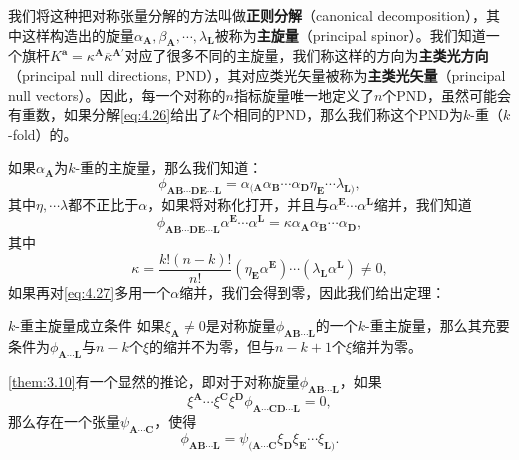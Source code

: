我们将这种把对称张量分解的方法叫做\textbf{正则分解}（canonical decomposition），其中这样构造出的旋量$\alpha _{\boldsymbol{A}} ,\beta _{\boldsymbol{A}} ,\cdots ,\lambda _{\boldsymbol{L}}$被称为\textbf{主旋量}（principal spinor）。我们知道一个旗杆$K^{\boldsymbol{a}} =\kappa ^{\boldsymbol{A}}\overline{\kappa }^{\boldsymbol{A} '}$对应了很多不同的主旋量，我们称这样的方向为\textbf{主类光方向}（principal null directions, PND），其对应类光矢量被称为\textbf{主类光矢量}（principal null vectors）。因此，每一个对称的$n$指标旋量唯一地定义了$n$个PND，虽然可能会有重数，如果分解\ref{eq:4.26}给出了$k$个相同的PND，那么我们称这个PND为$k$-重（$k$-fold）的。



如果$\alpha _{\boldsymbol{A}}$为$k$-重的主旋量，那么我们知道：
\begin{equation*}
	\phi _{\boldsymbol{AB} \cdots \boldsymbol{DE} \cdots \boldsymbol{L}} =\alpha _{(\boldsymbol{A}} \alpha _{\boldsymbol{B}} \cdots \alpha _{\boldsymbol{D}} \eta _{\boldsymbol{E}} \cdots \lambda _{\boldsymbol{L})} ,
\end{equation*}
其中$\eta ,\cdots \lambda $都不正比于$\alpha $，如果将对称化打开，并且与$\alpha ^{\boldsymbol{E}} \cdots \alpha ^{\boldsymbol{L}}$缩并，我们知道
\begin{equation}
	\phi _{\boldsymbol{AB} \cdots \boldsymbol{DE} \cdots \boldsymbol{L}} \alpha ^{\boldsymbol{E}} \cdots \alpha ^{\boldsymbol{L}} =\kappa \alpha _{\boldsymbol{A}} \alpha _{\boldsymbol{B}} \cdots \alpha _{\boldsymbol{D}} ,
	\label{eq:4.27}
\end{equation}
其中
\begin{equation*}
	\kappa =\frac{k!( n-k) !}{n!} (\eta _{\boldsymbol{E}} \alpha ^{\boldsymbol{E}} )\cdots (\lambda _{\boldsymbol{L}} \alpha ^{\boldsymbol{L}} )\neq 0,
\end{equation*}
如果再对\ref{eq:4.27}多用一个$\alpha $缩并，我们会得到零，因此我们给出定理：

\begin{them}[label={them:3.10}]{$k$-重主旋量成立条件}
	如果$\xi _{\boldsymbol{A}} \neq 0$是对称旋量$\phi _{\boldsymbol{AB} \cdots \boldsymbol{L}}$的一个$k$-重主旋量，那么其充要条件为$\phi _{\boldsymbol{A} \cdots \boldsymbol{L}}$与$n-k$个$\xi $的缩并不为零，但与$n-k+1$个$\xi $缩并为零。
\end{them}

\ref{them:3.10}有一个显然的推论，即对于对称旋量$\phi _{\boldsymbol{AB} \cdots \boldsymbol{L}}$，如果
\begin{equation*}
	\xi ^{\boldsymbol{A}} \cdots \xi ^{\boldsymbol{C}} \xi ^{\boldsymbol{D}} \phi _{\boldsymbol{A\cdots CD} \cdots \boldsymbol{L}} =0,
\end{equation*}
那么存在一个张量$\psi _{\boldsymbol{A} \cdots \boldsymbol{C}}$，使得
\begin{equation}
	\phi _{\boldsymbol{AB} \cdots \boldsymbol{L}} =\psi _{(\boldsymbol{A} \cdots \boldsymbol{C}} \xi _{\boldsymbol{D}} \xi _{\boldsymbol{E}} \cdots \xi _{\boldsymbol{L})} .
	\label{eq:4.28}
\end{equation}



